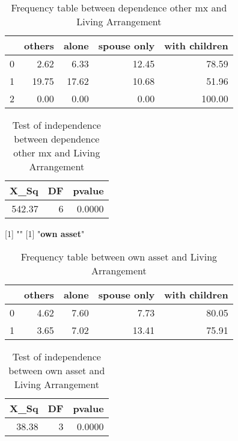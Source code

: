 \documentclass[11pt]{article}
\begin{document}
\begin{table}[H]
\centering
\begin{tabular}{rrrrr}
  \hline
 & others & alone & spouse only & with children \\ 
  \hline
0 & 2.62 & 6.33 & 12.45 & 78.59 \\ 
  1 & 19.75 & 17.62 & 10.68 & 51.96 \\ 
  2 & 0.00 & 0.00 & 0.00 & 100.00 \\ 
   \hline
\end{tabular}
\caption{Frequency table between dependence other mx and Living Arrangement} 
\end{table}
\begin{table}[H]
\centering
\begin{tabular}{rrr}
  \hline
X\_Sq & DF & pvalue \\ 
  \hline
542.37 & 6 & 0.0000 \\ 
   \hline
\end{tabular}
\caption{Test of independence between dependence other mx and Living Arrangement} 
\end{table}
[1] "\newline"
[1] "{\bf{own asset}}"
\begin{table}[H]
\centering
\begin{tabular}{rrrrr}
  \hline
 & others & alone & spouse only & with children \\ 
  \hline
0 & 4.62 & 7.60 & 7.73 & 80.05 \\ 
  1 & 3.65 & 7.02 & 13.41 & 75.91 \\ 
   \hline
\end{tabular}
\caption{Frequency table between own asset and Living Arrangement} 
\end{table}
\begin{table}[H]
\centering
\begin{tabular}{rrr}
  \hline
X\_Sq & DF & pvalue \\ 
  \hline
38.38 & 3 & 0.0000 \\ 
   \hline
\end{tabular}
\caption{Test of independence between own asset and Living Arrangement} 
\end{table}
\end{document}
